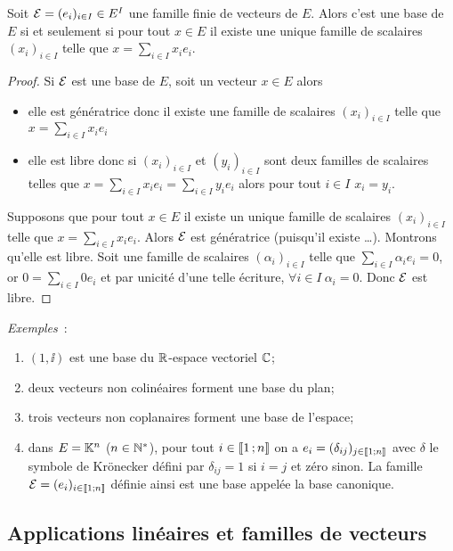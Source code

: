 \begin{theo}
  Soit $\mathcal{E} = (e_i)_{i \in I} \in E^I$ une famille finie de vecteurs de $E$. Alors c'est une base de $E$ si et seulement si pour tout $x \in E$ il existe une unique famille de scalaires $(x_i)_{i \in I}$ telle que $x=\sum_{i \in I}x_i e_i$.
\end{theo}
\begin{proof}
  Si $\mathcal{E}$ est une base de $E$, soit un vecteur $x \in E$ alors
  \begin{itemize}
  \item elle est génératrice donc il existe une famille de scalaires $(x_i)_{i \in I}$ telle que $x=\sum_{i \in I} x_i e_i$
  \item elle est libre donc si $(x_i)_{i \in I}$ et $(y_i)_{i \in I}$ sont deux familles de scalaires telles que $x=\sum_{i \in I} x_i e_i=\sum_{i \in I} y_i e_i$ alors pour tout $i \in I$ $x_i =y_i$.
  \end{itemize}

  Supposons que pour tout $x \in E$ il existe un unique famille de scalaires $(x_i)_{i \in I}$ telle que $x=\sum_{i \in I}x_i e_i$. Alors $\mathcal{E}$ est génératrice (puisqu'il existe \ldots). Montrons qu'elle est libre. Soit une famille de scalaires $(\alpha_i)_{i \in I}$ telle que $\sum_{i \in I} \alpha_i e_i=0$, or $0=\sum_{i \in I} 0 e_i$ et par unicité d'une telle écriture, $\forall i \in I \ \alpha_i=0$. Donc $\mathcal{E}$ est libre.
\end{proof}

\emph{Exemples}~:
\begin{enumerate}
\item $(1,\ii)$ est une base du $\mathbb{R}$-espace vectoriel $\mathbb{C}$;
\item deux vecteurs non colinéaires forment une base du plan;
\item trois vecteurs non coplanaires forment une base de l'espace;
\item dans $E=\mathbb{K}^n$ ($n \in \mathbb{N}^*$), pour tout $i \in \mathopen{\llbracket}1\mathclose{}\mathpunct{};n\mathclose{\rrbracket}$ on a $e_i = (\delta_{ij})_{j \in \mathopen{\llbracket}1\mathclose{}\mathpunct{};n\mathclose{\rrbracket}}$ avec $\delta$ le symbole de Krönecker défini par $\delta_{ij}=1$ si $i=j$ et zéro sinon. La famille $\mathcal{E}=(e_i)_{i \in \mathopen{\llbracket}1\mathclose{}\mathpunct{};n\mathclose{\rrbracket}}$ définie ainsi est une base appelée la base canonique.
\end{enumerate}

\subsection{Applications linéaires et familles de vecteurs}

